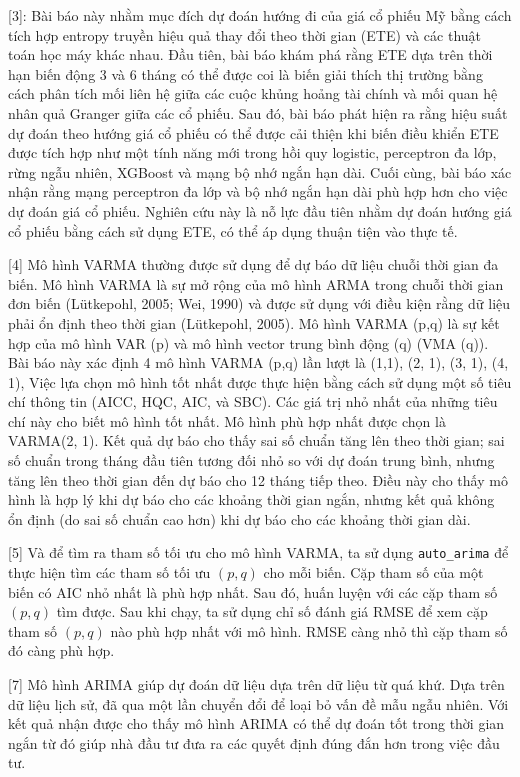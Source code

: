 \documentclass[conference]{IEEEtran}
\begin{document}
[3]: Bài báo này nhằm mục đích dự đoán hướng đi của giá cổ phiếu Mỹ bằng cách tích hợp entropy truyền hiệu quả thay đổi theo thời gian (ETE) và các thuật toán học máy khác nhau. Đầu tiên, bài báo khám phá rằng ETE dựa trên thời hạn biến động 3 và 6 tháng có thể được coi là biến giải thích thị trường bằng cách phân tích mối liên hệ giữa các cuộc khủng hoảng tài chính và mối quan hệ nhân quả Granger giữa các cổ phiếu. Sau đó, bài báo phát hiện ra rằng hiệu suất dự đoán theo hướng giá cổ phiếu có thể được cải thiện khi biến điều khiển ETE được tích hợp như một tính năng mới trong hồi quy logistic, perceptron đa lớp, rừng ngẫu nhiên, XGBoost và mạng bộ nhớ ngắn hạn dài. Cuối cùng, bài báo xác nhận rằng mạng perceptron đa lớp và bộ nhớ ngắn hạn dài phù hợp hơn cho việc dự đoán giá cổ phiếu. Nghiên cứu này là nỗ lực đầu tiên nhằm dự đoán hướng giá cổ phiếu bằng cách sử dụng ETE, có thể áp dụng thuận tiện vào thực tế.

[4] Mô hình VARMA thường được sử dụng để dự báo dữ liệu chuỗi thời gian đa biến. Mô hình VARMA là sự mở rộng của mô hình ARMA trong chuỗi thời gian đơn biến (Lütkepohl, 2005; Wei, 1990) và được sử dụng với điều kiện rằng dữ liệu phải ổn định theo thời gian (Lütkepohl, 2005). Mô hình VARMA (p,q) là sự kết hợp của mô hình VAR (p) và mô hình vector trung bình động (q) (VMA (q)). Bài báo này xác định 4 mô hình VARMA (p,q) lần lượt là (1,1), (2, 1), (3, 1), (4, 1), Việc lựa chọn mô hình tốt nhất được thực hiện bằng cách sử dụng một số tiêu chí thông tin (AICC, HQC, AIC, và SBC). Các giá trị nhỏ nhất của những tiêu chí này cho biết mô hình tốt nhất. Mô hình phù hợp nhất được chọn là VARMA(2, 1). Kết quả dự báo cho thấy sai số chuẩn tăng lên theo thời gian; sai số chuẩn trong tháng đầu tiên tương đối nhỏ so với dự đoán trung bình, nhưng tăng lên theo thời gian đến dự báo cho 12 tháng tiếp theo. Điều này cho thấy mô hình là hợp lý khi dự báo cho các khoảng thời gian ngắn, nhưng kết quả không ổn định (do sai số chuẩn cao hơn) khi dự báo cho các khoảng thời gian dài.

[5] Và để tìm ra tham số tối ưu cho mô hình VARMA, ta sử dụng \texttt{auto\_arima} để thực hiện tìm các tham số tối ưu $(p, q)$ cho mỗi biến. Cặp tham số của một biến có AIC nhỏ nhất là phù hợp nhất. Sau đó, huấn luyện với các cặp tham số $(p, q)$ tìm được. Sau khi chạy, ta sử dụng chỉ số đánh giá RMSE để xem cặp tham số $(p, q)$ nào phù hợp nhất với mô hình. RMSE càng nhỏ thì cặp tham số đó càng phù hợp.

[7] Mô hình ARIMA giúp dự đoán dữ liệu dựa trên dữ liệu từ quá khứ. Dựa trên dữ liệu lịch sử, đã qua một lần chuyển đổi để loại bỏ vấn đề mẫu ngẫu nhiên. Với kết quả nhận được cho thấy mô hình ARIMA có thể dự đoán tốt trong thời gian ngắn từ đó giúp nhà đầu tư đưa ra các quyết định đúng đắn hơn trong việc đầu tư.
\end{document}
